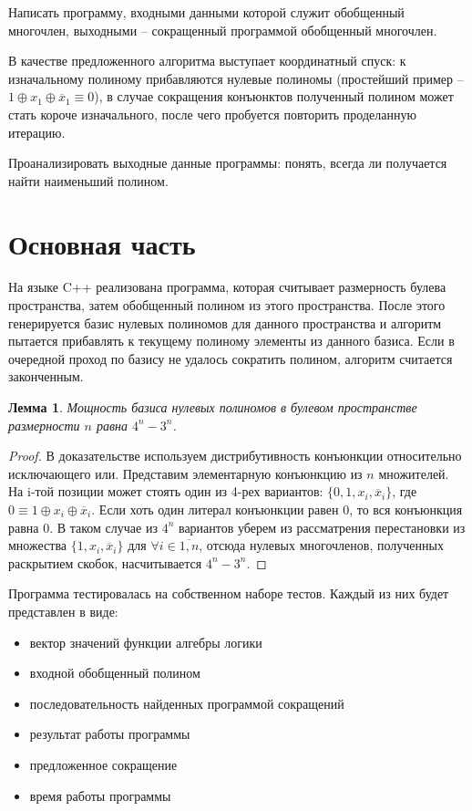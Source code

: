 \documentclass[a4paper,12pt,titlepage,finall]{article}
\newtheorem{lemma}{Лемма}
\begin{document}
Написать программу, входными данными которой служит обобщенный многочлен, выходными -- сокращенный программой обобщенный многочлен.

В качестве предложенного алгоритма выступает координатный спуск: к изначальному полиному прибавляются нулевые полиномы (простейший пример -- $1 \oplus x_1 \oplus \overline x_1 \equiv 0$), в случае сокращения конъюнктов полученный полином может стать короче изначального, после чего пробуется повторить проделанную итерацию.

Проанализировать выходные данные программы: понять, всегда ли получается найти наименьший полином.

\section{Основная часть}

На языке C++ реализована программа, которая считывает размерность булева пространства, затем обобщенный полином из этого пространства. После этого генерируется базис нулевых полиномов для данного пространства и алгоритм пытается прибавлять к текущему полиному элементы из данного базиса. Если в очередной проход по базису не удалось сократить полином, алгоритм считается законченным.

\begin{lemma}
    Мощность базиса нулевых полиномов в булевом пространстве размерности $n$ равна $4^n - 3^n$.
\end{lemma}
\begin{proof}
    В доказательстве используем дистрибутивность конъюнкции относительно исключающего или.
    Представим элементарную конъюнкцию из $n$ множителей. На i-той позиции может стоять один из 4-рех вариантов: $\{0, 1, x_i, \overline x_i \}$, где $0 \equiv 1 \oplus x_i \oplus \overline x_i$. Если хоть один литерал конъюнкции равен 0, то вся конъюнкция равна 0. В таком случае из $4^n$ вариантов уберем из рассматрения перестановки из множества $\{1, x_i, \overline x_i \}$ для $\forall i \in \overline{1, n}$, отсюда нулевых многочленов, полученных раскрытием скобок, насчитывается $4^n - 3^n$.
\end{proof}

Программа тестировалась на собственном наборе тестов.
Каждый из них будет представлен в виде:
\begin{itemize}
    \item вектор значений функции алгебры логики
    \item входной обобщенный полином
    \item последовательность найденных программой сокращений
    \item результат работы программы
    \item предложенное сокращение
    \item время работы программы
\end{itemize}
\end{document}
